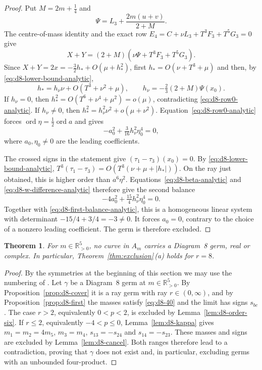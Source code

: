 \documentclass[11pt]{amsart}
\newtheorem{theorem}{Theorem}[section]
\theoremstyle{definition}
\theoremstyle{remark}
\newcommand{\Rp}{\mathbb{R}_{>0}}
\begin{document}
{\begin{proof}
Put $M=2m+\tfrac14$ and
\[
\Psi=L_3+\frac{2m(u+v)}{2+M}.
\]
The centre-of-mass identity and the exact row
$E_4=C+\nu L_3+T^3F_3+T^5G_3=0$ give
\[
X+Y=(2+M)(\nu\Psi+T^3F_3+T^5G_3).
\]
Since $X+Y=2x=-\tfrac32h_*+O(\mu+h_*^2)$, first
$h_*=O(\nu+T^3+\mu)$ and then, by
\eqref{eq:d8-lower-bound-analytic},
\[
h_*=h_\nu\nu+O(T^3+\nu^2+\mu),\qquad
h_\nu=-\tfrac23(2+M)\Psi(x_0).
\]
If $h_\nu=0$, then
$h_*^2=O(T^6+\nu^4+\mu^2)=o(\mu)$, contradicting
\eqref{eq:d8-row0-analytic}.
If $h_\nu\ne0$, then
$h_*^2=h_\nu^2\nu^2+o(\mu+\nu^2)$.
Equation~\eqref{eq:d8-row0-analytic} forces
$\operatorname{ord}\eta=\tfrac12\operatorname{ord}a$ and gives
\begin{equation}\label{eq:d8-first-balance-analytic}
-a_0^2+\tfrac3{16}h_\nu^2\eta_0^4=0,
\end{equation}
where $a_0,\eta_0\ne0$ are the leading coefficients.

The crossed signs in the statement give $(\tau_1-\tau_3)(x_0)=0$.
By \eqref{eq:d8-lower-bound-analytic},
$T^3(\tau_1-\tau_3)=O(T^3(\nu+\mu+|h_*|))$.
On the ray just obtained, this is higher order than $a^6\eta^2$.
Equations~\eqref{eq:d8-beta-analytic} and
\eqref{eq:d8-w-difference-analytic} therefore give the second balance
\[
-4a_0^2+\tfrac{15}{4}h_\nu^2\eta_0^4=0.
\]
Together with \eqref{eq:d8-first-balance-analytic}, this is a homogeneous
linear system with determinant $-15/4+3/4=-3\ne0$.  It forces $a_0=0$,
contrary to the choice of a nonzero leading coefficient.  The germ is therefore excluded.
\end{proof}

}\begin{theorem}\label{thm:d8}
For $m\in\Rp^5$, no curve in $A_m$ carries a Diagram~8 germ, real or complex.
In particular, Theorem~\ref{thm:exclusion}\,(a) holds for $r=8$.
\end{theorem}

\begin{proof}
By the symmetries at the beginning of this section we may use the numbering of
\cite[\S8.8]{AK}.  Let $\gamma$ be a Diagram~8 germ at $m\in\Rp^5$.  By
Proposition~\ref{prop:d8-cover} it is a ray germ with ray $r\in(0,\infty)$, and by
Proposition~\ref{prop:d8-first} the masses satisfy \eqref{eq:d8-40} and the limit has signs
$s_{bc}$.  The case $r>2$, equivalently $0<p<2$, is excluded by
Lemma~\ref{lem:d8-order-six}.  If $r\le2$, equivalently $-4<p\le0$,
Lemma~\ref{lem:d8-kappa} gives $m_1=m_2=4m_5$, $m_3=m_4$, $s_{13}=-s_{24}$
and $s_{14}=-s_{23}$.  These masses and signs are excluded by
Lemma~\ref{lem:d8-cancel}.  Both ranges therefore lead to a contradiction, proving that
$\gamma$ does not exist and, in particular, excluding germs with an unbounded four-product.
\end{proof}
\end{document}
